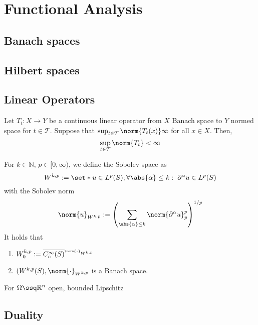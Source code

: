\section{Functional Analysis}

\subsection{Banach spaces}


\subsection{Hilbert spaces}


\subsection{Linear Operators}


\begin{thm}
  Let $T_t:X \to Y$ be a continuous linear operator from $X$ Banach space to $Y$ normed space for $t \in \mathcal{T}$. Suppose that $\sup_{t\in \mathcal{T}}\norm{T_t(x)}\infty$ for all $x\in X$. Then, 
  \[\sup_{t\in \mathcal{T}}\norm{T_t}< \infty\]
\end{thm}



\begin{defn}
For $k \in \mathbb{N},\, p \in [0,\infty)$, we define the Sobolev space as
\[W^{k,p} := \set*{u\in L^p(S)}; \forall \abs{\alpha}\leq k:\;\partial^\alpha u \in L^p(S)\]
with the Sobolev norm 
\[\norm{u}_{W^{k,p}}:= \left( \sum_{\abs{\alpha} \leq k} \norm{\partial^\alpha u}_p^p\right)^{1/p}\]
It holds that 
\begin{enumerate}
  \item \(W_0^{k,p}:= \overline{C_c^\infty(S)}^{_{\norm{\cdot}_{W^{k,p}}}}\)
  \item \((W^{k,p}(S), \norm{\cdot}_{W^{k,p}}\) is a Banach space.
\end{enumerate}

\end{defn}


\begin{thm}[Rellich]
    For $\Omega \ssq   \mathbb{R}^n$ open, bounded Lipschitz
\end{thm}


\subsection{Duality}


